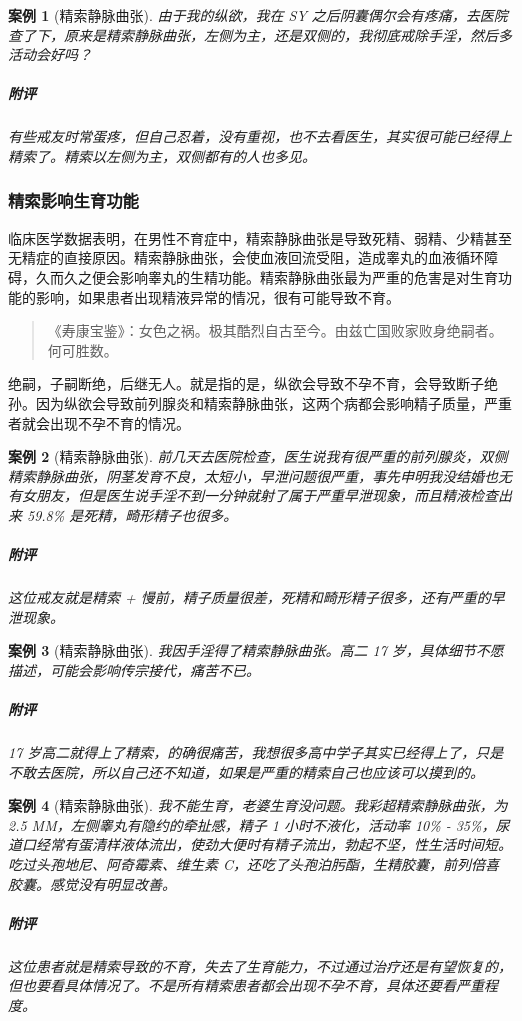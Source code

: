 \documentclass{ctexart}
\newtheorem{case}{案例}
\begin{document}
\begin{case}[精索静脉曲张]
    由于我的纵欲，我在 SY 之后阴囊偶尔会有疼痛，去医院查了下，原来是精索静脉曲张，左侧为主，还是双侧的，我彻底戒除手淫，然后多活动会好吗？
    \subparagraph{附评} 有些戒友时常蛋疼，但自己忍着，没有重视，也不去看医生，其实很可能已经得上精索了。精索以左侧为主，双侧都有的人也多见。
\end{case}

\subsubsection{精索影响生育功能}

临床医学数据表明，在男性不育症中，精索静脉曲张是导致死精、弱精、少精甚至无精症的直接原因。精索静脉曲张，会使血液回流受阻，造成睾丸的血液循环障碍，久而久之便会影响睾丸的生精功能。精索静脉曲张最为严重的危害是对生育功能的影响，如果患者出现精液异常的情况，很有可能导致不育。

\begin{quote}
    《寿康宝鉴》：女色之祸。极其酷烈自古至今。由兹亡国败家败身绝嗣者。何可胜数。
\end{quote}

绝嗣，子嗣断绝，后继无人。就是指的是，纵欲会导致不孕不育，会导致断子绝孙。因为纵欲会导致前列腺炎和精索静脉曲张，这两个病都会影响精子质量，严重者就会出现不孕不育的情况。

\begin{case}[精索静脉曲张]
    前几天去医院检查，医生说我有很严重的前列腺炎，双侧精索静脉曲张，阴茎发育不良，太短小，早泄问题很严重，事先申明我没结婚也无有女朋友，但是医生说手淫不到一分钟就射了属于严重早泄现象，而且精液检查出来 59.8\% 是死精，畸形精子也很多。
    \subparagraph{附评} 这位戒友就是精索 + 慢前，精子质量很差，死精和畸形精子很多，还有严重的早泄现象。
\end{case}

\begin{case}[精索静脉曲张]
    我因手淫得了精索静脉曲张。高二 17 岁，具体细节不愿描述，可能会影响传宗接代，痛苦不已。
    \subparagraph{附评} 17 岁高二就得上了精索，的确很痛苦，我想很多高中学子其实已经得上了，只是不敢去医院，所以自己还不知道，如果是严重的精索自己也应该可以摸到的。
\end{case}

\begin{case}[精索静脉曲张]
    我不能生育，老婆生育没问题。我彩超精索静脉曲张，为 2.5 MM，左侧睾丸有隐约的牵扯感，精子 1 小时不液化，活动率 10\% - 35\%，尿道口经常有蛋清样液体流出，使劲大便时有精子流出，勃起不坚，性生活时间短。吃过头孢地尼、阿奇霉素、维生素 C，还吃了头孢泊肟酯，生精胶囊，前列倍喜胶囊。感觉没有明显改善。
    \subparagraph{附评} 这位患者就是精索导致的不育，失去了生育能力，不过通过治疗还是有望恢复的，但也要看具体情况了。不是所有精索患者都会出现不孕不育，具体还要看严重程度。
\end{case}
\end{document}
